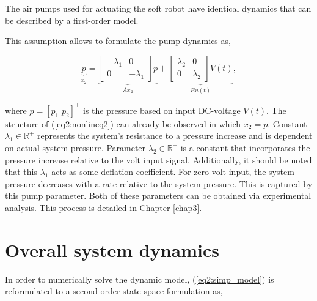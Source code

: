 \begin{theorem}
The air pumps used for actuating the soft robot have identical dynamics that can be described by a first-order model.
\end{theorem}

This assumption allows to formulate the pump dynamics as,

\begin{equation}
 \underbrace{\dot{p}}_{\dot{x_2}}  = \underbrace{\begin{bmatrix} -\lambda_1 & 0 \\ 0 & -\lambda_1 \end{bmatrix} p}_{Ax_2} + \underbrace{\begin{bmatrix} \lambda_2 & 0 \\ 0 & \lambda_2 \end{bmatrix} V(t)}_{Bu(t)},
    \label{eq2:pumpmodel}
\end{equation}

where $p =  [p_1 \hspace{4pt} p_2]^\top$ is the pressure based on input DC-voltage $V(t)$. The structure of (\ref{eq2:nonlineq2}) can already be observed in which $x_2 = p$. Constant $\lambda_1 \in \mathbb{R}^+$ represents the system's resistance to a pressure increase and is dependent on actual system pressure. Parameter $\lambda_2 \in \mathbb{R}^+$ is a constant that incorporates the pressure increase relative to the volt input signal. Additionally, it should be noted that this $\lambda_1$ acts as some deflation coefficient. For zero volt input, the system pressure decreases with a rate relative to the system pressure. This is captured by this pump parameter. Both of these parameters can be obtained via experimental analysis. This process is detailed in Chapter \ref{chap3}.







\section{Overall system dynamics}


In order to numerically solve the dynamic model,  (\ref{eq2:simp_model}) is reformulated to a second order state-space formulation as,

